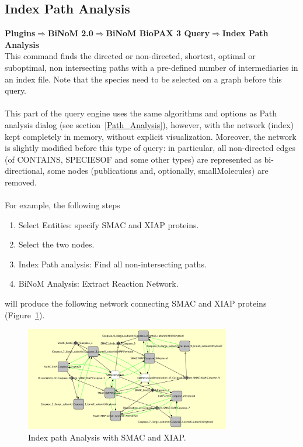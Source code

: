 \parbox{\textwidth}{

\subsection{Index Path Analysis}

\textbf{Plugins$\Rightarrow$BiNoM 2.0$\Rightarrow$BiNoM BioPAX 3 Query$\Rightarrow$Index Path Analysis}\\

This command finds the directed or non-directed, shortest, optimal or
suboptimal, non intersecting paths with a pre-defined number of intermediaries
in an index file. Note that the species need to be selected on a graph before
this query.\\\\
This part of the query engine uses the same algorithms and options as Path
analysis dialog (see section~\ref{Path_Analysis}), however, with the network
(index) kept completely in memory, without explicit visualization. Moreover, the
network is slightly modified before this type of query: in particular, all
non-directed edges (of CONTAINS, SPECIESOF and some other types) are represented
as bi-directional, some nodes (publications and, optionally, smallMolecules) are
removed.\\\\
For example, the following steps

\begin{enumerate}
\item Select Entities: specify SMAC and XIAP proteins.
\item Select the two nodes.
\item Index Path analysis: Find all non-intersecting paths.
\item BiNoM Analysis: Extract Reaction Network.
\end{enumerate}

will produce the following network connecting SMAC and XIAP proteins (Figure~\ref{Index_Path_Analysis}).

}

\begin{figure}
\centering
\includegraphics[width=0.8\textwidth]{graphics/ebo_index_path}
\caption{Index path Analysis with SMAC and XIAP.}
\label{Index_Path_Analysis}
\end{figure}

